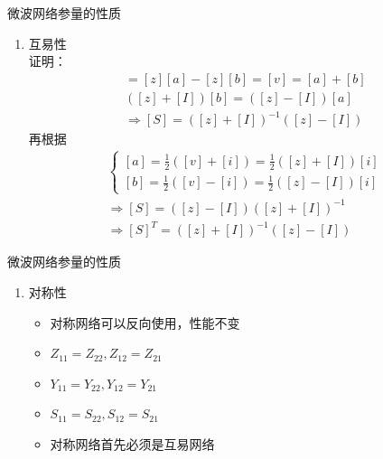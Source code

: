 \begin{frame}{微波网络参量的性质}
    \begin{enumerate}
        \item 互易性 \\
        证明：
        \begin{align*}
            [z][i]=[z][a]-[z][b]=[v]=[a]+[b]\\
            ([z]+[I])[b]=([z]-[I])[a]\\
            \Rightarrow[S]=([z]+[I])^{-1}([z]-[I])
        \end{align*}
        再根据
        \begin{align*}
            \begin{cases}
                [a]=\frac{1}{2}([v]+[i])=\frac{1}{2}([z]+[I])[i] \\
                [b]=\frac{1}{2}([v]-[i])=\frac{1}{2}([z]-[I])[i]
            \end{cases}\\
            \Rightarrow [S]=([z]-[I])([z]+[I])^{-1}\\
            \Rightarrow [S]^T=([z]+[I])^{-1}([z]-[I])
        \end{align*}
    \end{enumerate}
\end{frame}

\begin{frame}{微波网络参量的性质}
    \begin{enumerate}
        \resume
        \item 对称性
              \begin{itemize}
                  \item 对称网络可以反向使用，性能不变
                  \item $Z_{11}=Z_{22},Z_{12}=Z_{21}$
                  \item $Y_{11}=Y_{22},Y_{12}=Y_{21}$
                  \item $S_{11}=S_{22},S_{12}=S_{21}$
                  \item 对称网络首先必须是互易网络
              \end{itemize}
              \saveenum
    \end{enumerate}
\end{frame}

